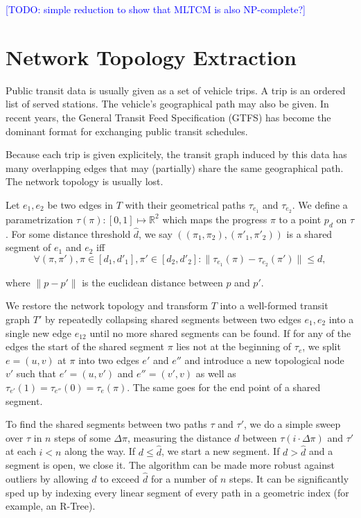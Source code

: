 \documentclass{llncs}
\newcommand\todo[1]{\textcolor{blue}{[TODO: #1]}}
\begin{document}
\todo{simple reduction to show that MLTCM is also NP-complete?}

%
\section{Network Topology Extraction}\label{SEC:topo}
%

Public transit data is usually given as a set of vehicle trips. A trip is an ordered list of served stations. The vehicle's geographical path may also be given. In recent years, the General Transit Feed Specification (GTFS) has become the dominant format for exchanging public transit schedules.

Because each trip is given explicitely, the transit graph induced by this data has many overlapping edges that may (partially) share the same geographical path. The network topology is usually lost.

Let $e_1, e_2$ be two edges in $T$ with their geometrical paths $\tau_{e_1}$ and $\tau_{e_2}$. We define a parametrization $\tau(\pi): [0,1] \mapsto \mathbb{R}^2$ which maps the progress $\pi$ to a point $p_d$ on $\tau$. For some distance threshold $\hat{d}$, we say $((\pi_1, \pi_2), ({\pi'}_1, {\pi'}_2))$ is a shared segment of $e_1$ and $e_2$ iff \[\forall (\pi, \pi'), \pi \in [d_1, {d'}_1], \pi' \in [d_2, {d'}_2] : \|\tau_{e_1}(\pi) - \tau_{e_2}(\pi')\| \leq d,\]

where $\|p - p'\|$ is the euclidean distance between $p$ and $p'$.

We restore the network topology and transform $T$ into a well-formed transit graph $T'$ by repeatedly collapsing shared segments between two edges $e_1, e_2$ into a single new edge $e_{12}$ until no more shared segments can be found. If for any of the edges the start of the shared segment $\pi$ lies not at the beginning of $\tau_e$, we split $e = (u, v)$ at $\pi$ into two edges $e'$ and $e''$ and introduce a new topological node $v'$ such that $e' = (u, v')$ and $e'' = (v', v)$ as well as $\tau_{e'}(1) = \tau_{e''}(0) = \tau_{e}(\pi)$. The same goes for the end point of a shared segment.

To find the shared segments between two paths $\tau$ and $\tau'$, we do a simple sweep over $\tau$ in $n$ steps of some $\Delta\pi$, measuring the distance $d$ between $\tau(i\cdot\Delta\pi)$ and $\tau'$ at each $i < n$ along the way. If $d \leq \hat{d}$, we start a new segment. If $d > \hat{d}$ and a segment is open, we close it. The algorithm can be made more robust against outliers by allowing $d$ to exceed $\hat{d}$ for a number of $n$ steps. It can be significantly sped up by indexing every linear segment of every path in a geometric index (for example, an R-Tree).
\end{document}
